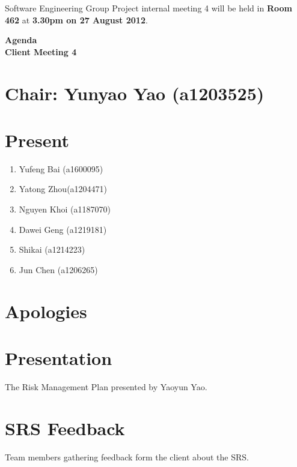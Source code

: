 \documentclass[11pt, a4paper]{article}
\begin{document}
\noindent Software Engineering Group Project internal meeting 4 will be held in {\bf Room 462} at {\bf 3.30pm on 27 August 2012}.


\vspace*{15pt}

\begin{center}
\huge \bf Agenda \\Client Meeting 4
\end{center}



\section*{Chair: Yunyao Yao (a1203525)}
\section*{Present}
\begin{enumerate}
\item Yufeng Bai (a1600095)
\item Yatong Zhou(a1204471)
\item Nguyen Khoi (a1187070)
\item Dawei Geng (a1219181)
\item Shikai (a1214223)
\item Jun Chen (a1206265)
\end{enumerate}
\section{Apologies}

\section{Presentation}
The Risk Management Plan presented by Yaoyun Yao.

\section{SRS Feedback}
Team members gathering feedback form the client about the SRS. 
\end{document}
